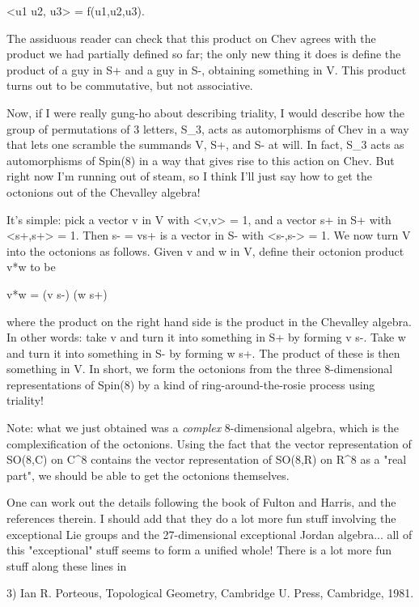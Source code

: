<u1 u2, u3> = f(u1,u2,u3).

The assiduous reader can check that this product on Chev agrees
with the product we had partially defined so far; the only new thing
it does is define the product of a guy in S+ and a guy in S-, obtaining
something in V.  This product turns out to be commutative, but not
associative.  

Now, if I were really gung-ho about describing triality, I would
describe how the group of permutations of 3 letters, S_3, acts as
automorphisms of Chev in a way that lets one scramble the summands
V, S+, and S- at will.  In fact, S_3 acts as automorphisms of Spin(8)
in a way that gives rise to this action on Chev.  But right now I'm 
running out of steam, so I think I'll just say how to get the octonions
out of the Chevalley algebra!  

It's simple: pick a vector v in V with <v,v> = 1, and a vector 
s+ in S+ with <s+,s+> = 1.  Then s- = vs+ is a vector in S- with
<s-,s-> = 1.  We now turn V into the octonions as follows.
Given v and w in V, define their octonion product v*w to be

v*w = (v s-) (w s+)

where the product on the right hand side is the product in the Chevalley 
algebra.  In other words: take v and turn it into something in S+
by forming v s-.  Take w and turn it into something in S- by forming
w s+.  The product of these is then something in V.  In short, we
form the octonions from the three 8-dimensional representations of Spin(8)
by a kind of ring-around-the-rosie process using triality!

Note: what we just obtained was a \emph{complex} 8-dimensional algebra, 
which is the complexification of the octonions.  Using the fact
that the vector representation of SO(8,C) on C^8 contains the
vector representation of SO(8,R) on R^8 as a "real part", we should
be able to get the octonions themselves.

One can work out the details following the book of Fulton and Harris, and
the references therein.  I should add that they do a lot more fun stuff
involving the exceptional Lie groups and the 27-dimensional exceptional
Jordan algebra... all of this "exceptional" stuff seems to form a unified
whole!  There is a lot more fun stuff along these lines in 

3) Ian R. Porteous, Topological Geometry, Cambridge U. Press, Cambridge,
1981.

